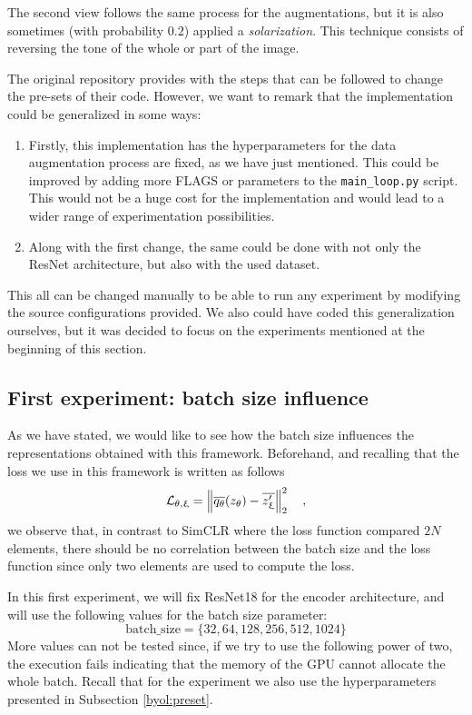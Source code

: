 The second view follows the same process for the augmentations, but it is also sometimes (with probability $0.2$) applied a \emph{solarization}. This technique consists of reversing the tone of the whole or part of the image.


The original repository provides with the steps that can be followed to change the pre-sets of their code. However, we want to remark that the implementation could be generalized in some ways:
\begin{enumerate}
\item Firstly, this implementation has the hyperparameters for the data augmentation process are fixed, as we have just mentioned. This could be improved by adding more FLAGS or parameters to the \lstinline{main_loop.py} script. This would not be a huge cost for the implementation and would lead to a wider range of experimentation possibilities.

\item Along with the first change, the same could be done with not only the ResNet architecture, but also with the used dataset.
\end{enumerate}

This all can be changed manually to be able to run any experiment by modifying the source configurations provided. We also could have coded this generalization ourselves, but it was decided to focus on the experiments mentioned at the beginning of this section.

\subsection{First experiment: batch size influence}
\label{experiments:byol:first}

As we have stated, we would like to see how the batch size influences the representations obtained with this framework.  Beforehand, and recalling that the loss we use in this framework is written as follows
\[
\mathcal L_{\theta,\upxi} = \left\lVert\overline{q_\theta}(z_\theta) - \overline{z_\upxi'}\right\rVert_2^2\quad , 
\]
we observe that, in contrast to SimCLR where the loss function compared $2N$ elements, there should be no correlation between the batch size and the loss function since only two elements are used to compute the loss. 

In this first experiment, we will fix ResNet18 for the encoder architecture, and will use the following values for the batch size parameter:
\[
\text{batch\_size} = \{32,64,128,256,512,1024\}    
\]
More values can not be tested since, if we try to use the following power of two, the execution fails indicating that the memory of the GPU cannot allocate the whole batch. Recall that for the experiment we also use the hyperparameters presented in Subsection \ref{byol:preset}.

